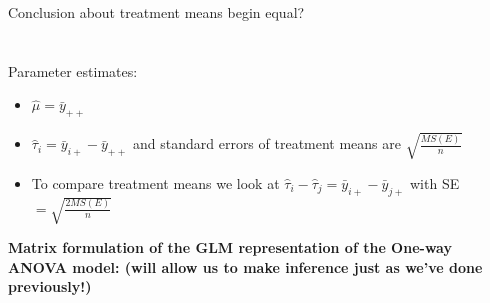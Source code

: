 Conclusion about treatment means begin equal?\\~\\~\\

Parameter estimates:
\begin{itemize}
\item $\hat\mu = \bar{y}_{++}$
\item $\hat\tau_i = \bar{y}_{i+}-\bar{y}_{++}$ and standard errors of treatment means are $\sqrt{\frac{MS(E)}{n}}$
\item To compare treatment means we look at $\hat\tau_i-\hat\tau_j=\bar{y}_{i+}-\bar{y}_{j+}$ with SE $= \sqrt{\frac{2MS(E)}{n}}$
\end{itemize}

\newpage

\textbf{Matrix formulation of the GLM representation of the One-way ANOVA model: (will allow us to make inference just as we've done previously!)}\\~\\
